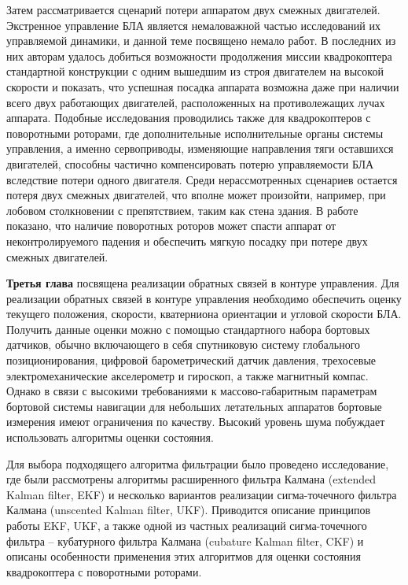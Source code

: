 Затем рассматривается сценарий потери аппаратом двух смежных двигателей. Экстренное управление БЛА является немаловажной частью исследований их управляемой динамики, и данной теме посвящено немало работ. В последних из них авторам удалось добиться возможности продолжения миссии квадрокоптера стандартной конструкции с одним вышедшим из строя двигателем на высокой скорости и показать, что успешная посадка аппарата возможна даже при наличии всего двух работающих двигателей, расположенных на противолежащих лучах аппарата. Подобные исследования проводились также для квадрокоптеров с поворотными роторами, где дополнительные исполнительные органы системы управления, а именно сервоприводы, изменяющие направления тяги оставшихся двигателей, способны частично компенсировать потерю управляемости БЛА вследствие потери одного двигателя.
Среди нерассмотренных сценариев остается потеря двух смежных двигателей, что вполне может произойти, например, при лобовом столкновении с препятствием, таким как стена здания.
В работе показано, что наличие поворотных роторов может спасти аппарат от неконтролируемого падения и обеспечить мягкую посадку при потере двух смежных двигателей.

\textbf{Третья глава} посвящена реализации обратных связей в контуре управления. Для реализации обратных связей в контуре управления необходимо обеспечить оценку текущего положения, скорости, кватерниона ориентации и угловой скорости БЛА. Получить данные оценки можно с помощью стандартного набора бортовых датчиков, обычно включающего в себя спутниковую систему глобального позиционирования, цифровой барометрический датчик давления, трехосевые электромеханические акселерометр и гироскоп, а также магнитный компас. Однако в связи с высокими требованиями к массово-габаритным параметрам бортовой системы навигации для небольших летательных аппаратов бортовые измерения имеют ограничения по качеству. Высокий уровень шума побуждает использовать алгоритмы оценки состояния.

Для выбора подходящего алгоритма фильтрации было проведено исследование, где были рассмотрены  алгоритмы расширенного фильтра Калмана (extended Kalman filter, EKF) и несколько вариантов реализации сигма-точечного фильтра Калмана (unscented Kalman filter, UKF). Приводится описание принципов работы EKF, UKF, а также одной из частных реализаций сигма-точечного фильтра -- кубатурного фильтра Калмана (cubature Kalman filter, CKF) и описаны особенности применения этих алгоритмов для оценки состояния квадрокоптера с поворотными роторами.


